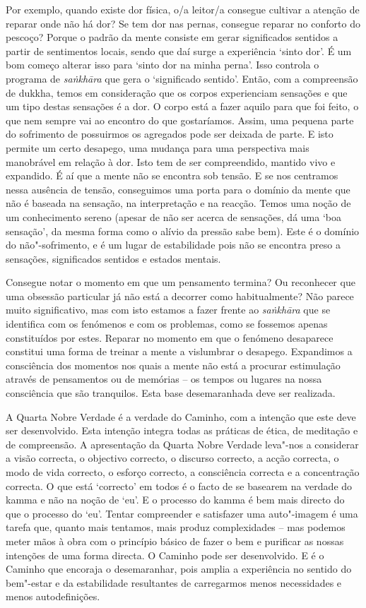 Por exemplo, quando existe dor física, o/a leitor/a consegue cultivar a atenção de reparar onde não há dor? Se tem dor nas pernas, consegue reparar no conforto do pescoço? Porque o padrão da mente consiste em gerar significados sentidos a partir de sentimentos locais, sendo que daí surge a experiência `sinto dor'. É um bom começo alterar isso para `sinto dor na minha perna'. Isso controla o programa de \emph{saṅkhāra} que gera o `significado sentido'. Então, com a compreensão de dukkha, temos em consideração que os corpos experienciam sensações e que um tipo destas sensações é a dor. O corpo está a fazer aquilo para que foi feito, o que nem sempre vai ao encontro do que gostaríamos. Assim, uma pequena parte do sofrimento de possuirmos os agregados pode ser deixada de parte. E isto permite um certo desapego, uma mudança para uma perspectiva mais manobrável em relação à dor. Isto tem de ser compreendido, mantido vivo e expandido. É aí que a mente não se encontra sob tensão. E se nos centramos nessa ausência de tensão, conseguimos uma porta para o domínio da mente que não é baseada na sensação, na interpretação e na reacção. Temos uma noção de um conhecimento sereno (apesar de não ser acerca de sensações, dá uma `boa sensação', da mesma forma como o alívio da pressão sabe bem). Este é o domínio do não"-sofrimento, e é um lugar de estabilidade pois não se encontra preso a sensações, significados sentidos e estados mentais.

Consegue notar o momento em que um pensamento termina? Ou reconhecer que uma obsessão particular já não está a decorrer como habitualmente? Não parece muito significativo, mas com isto estamos a fazer frente ao \emph{saṅkhāra} que se identifica com os fenómenos e com os problemas, como se fossemos apenas constituídos por estes. Reparar no momento em que o fenómeno desaparece constitui uma forma de treinar a mente a vislumbrar o desapego. Expandimos a consciência dos momentos nos quais a mente não está a procurar estimulação através de pensamentos ou de memórias -- os tempos ou lugares na nossa consciência que são tranquilos. Esta base desemaranhada deve ser realizada.

A Quarta Nobre Verdade é a verdade do Caminho, com a intenção que este deve ser desenvolvido. Esta intenção integra todas as práticas de ética, de meditação e de compreensão. A apresentação da Quarta Nobre Verdade leva"-nos a considerar a visão correcta, o objectivo correcto, o discurso correcto, a acção correcta, o modo de vida correcto, o esforço correcto, a consciência correcta e a concentração correcta. O que está `correcto' em todos é o facto de se basearem na verdade do kamma e não na noção de `eu'. E o processo do kamma é bem mais directo do que o processo do `eu'. Tentar compreender e satisfazer uma auto"-imagem é uma tarefa que, quanto mais tentamos, mais produz complexidades -- mas podemos meter mãos à obra com o princípio básico de fazer o bem e purificar as nossas intenções de uma forma directa. O Caminho pode ser desenvolvido. E é o Caminho que encoraja o desemaranhar, pois amplia a experiência no sentido do bem"-estar e da estabilidade resultantes de carregarmos menos necessidades e menos autodefinições.

